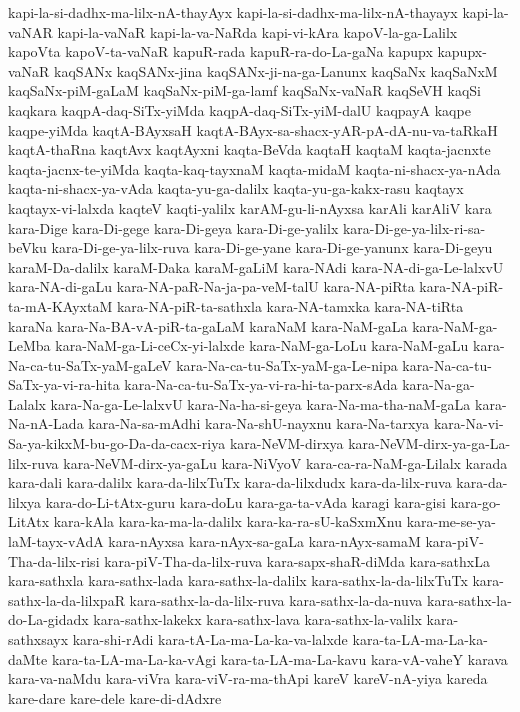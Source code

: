 {kapi-la-si-dadhx-ma-lilx-nA-thayAyx
kapi-la-si-dadhx-ma-lilx-nA-thayayx
kapi-la-vaNAR
kapi-la-vaNaR
kapi-la-va-NaRda
kapi-vi-kAra
kapoV-la-ga-Lalilx
kapoVta
kapoV-ta-vaNaR
kapuR-rada
kapuR-ra-do-La-gaNa
kapupx
kapupx-vaNaR
kaqSANx
kaqSANx-jina
kaqSANx-ji-na-ga-Lanunx
kaqSaNx
kaqSaNxM
kaqSaNx-piM-gaLaM
kaqSaNx-piM-ga-lamf
kaqSaNx-vaNaR
kaqSeVH
kaqSi
kaqkara
kaqpA-daq-SiTx-yiMda
kaqpA-daq-SiTx-yiM-dalU
kaqpayA
kaqpe
kaqpe-yiMda
kaqtA-BAyxsaH
kaqtA-BAyx-sa-shacx-yAR-pA-dA-nu-va-taRkaH
kaqtA-thaRna
kaqtAvx
kaqtAyxni
kaqta-BeVda
kaqtaH
kaqtaM
kaqta-jacnxte
kaqta-jacnx-te-yiMda
kaqta-kaq-tayxnaM
kaqta-midaM
kaqta-ni-shacx-ya-nAda
kaqta-ni-shacx-ya-vAda
kaqta-yu-ga-dalilx
kaqta-yu-ga-kakx-rasu
kaqtayx
kaqtayx-vi-lalxda
kaqteV
kaqti-yalilx
karAM-gu-li-nAyxsa
karAli
karAliV
kara
kara-Dige
kara-Di-gege
kara-Di-geya
kara-Di-ge-yalilx
kara-Di-ge-ya-lilx-ri-sa-beVku
kara-Di-ge-ya-lilx-ruva
kara-Di-ge-yane
kara-Di-ge-yanunx
kara-Di-geyu
karaM-Da-dalilx
karaM-Daka
karaM-gaLiM
kara-NAdi
kara-NA-di-ga-Le-lalxvU
kara-NA-di-gaLu
kara-NA-paR-Na-ja-pa-veM-talU
kara-NA-piRta
kara-NA-piR-ta-mA-KAyxtaM
kara-NA-piR-ta-sathxla
kara-NA-tamxka
kara-NA-tiRta
karaNa
kara-Na-BA-vA-piR-ta-gaLaM
karaNaM
kara-NaM-gaLa
kara-NaM-ga-LeMba
kara-NaM-ga-Li-ceCx-yi-lalxde
kara-NaM-ga-LoLu
kara-NaM-gaLu
kara-Na-ca-tu-SaTx-yaM-gaLeV
kara-Na-ca-tu-SaTx-yaM-ga-Le-nipa
kara-Na-ca-tu-SaTx-ya-vi-ra-hita
kara-Na-ca-tu-SaTx-ya-vi-ra-hi-ta-parx-sAda
kara-Na-ga-Lalalx
kara-Na-ga-Le-lalxvU
kara-Na-ha-si-geya
kara-Na-ma-tha-naM-gaLa
kara-Na-nA-Lada
kara-Na-sa-mAdhi
kara-Na-shU-nayxnu
kara-Na-tarxya
kara-Na-vi-Sa-ya-kikxM-bu-go-Da-da-cacx-riya
kara-NeVM-dirxya
kara-NeVM-dirx-ya-ga-La-lilx-ruva
kara-NeVM-dirx-ya-gaLu
kara-NiVyoV
kara-ca-ra-NaM-ga-Lilalx
karada
kara-dali
kara-dalilx
kara-da-lilxTuTx
kara-da-lilxdudx
kara-da-lilx-ruva
kara-da-lilxya
kara-do-Li-tAtx-guru
kara-doLu
kara-ga-ta-vAda
karagi
kara-gisi
kara-go-LitAtx
kara-kAla
kara-ka-ma-la-dalilx
kara-ka-ra-sU-kaSxmXnu
kara-me-se-ya-laM-tayx-vAdA
kara-nAyxsa
kara-nAyx-sa-gaLa
kara-nAyx-samaM
kara-piV-Tha-da-lilx-risi
kara-piV-Tha-da-lilx-ruva
kara-sapx-shaR-diMda
kara-sathxLa
kara-sathxla
kara-sathx-lada
kara-sathx-la-dalilx
kara-sathx-la-da-lilxTuTx
kara-sathx-la-da-lilxpaR
kara-sathx-la-da-lilx-ruva
kara-sathx-la-da-nuva
kara-sathx-la-do-La-gidadx
kara-sathx-lakekx
kara-sathx-lava
kara-sathx-la-valilx
kara-sathxsayx
kara-shi-rAdi
kara-tA-La-ma-La-ka-va-lalxde
kara-ta-LA-ma-La-ka-daMte
kara-ta-LA-ma-La-ka-vAgi
kara-ta-LA-ma-La-kavu
kara-vA-vaheY
karava
kara-va-naMdu
kara-viVra
kara-viV-ra-ma-thApi
kareV
kareV-nA-yiya
kareda
kare-dare
kare-dele
kare-di-dAdxre
}
